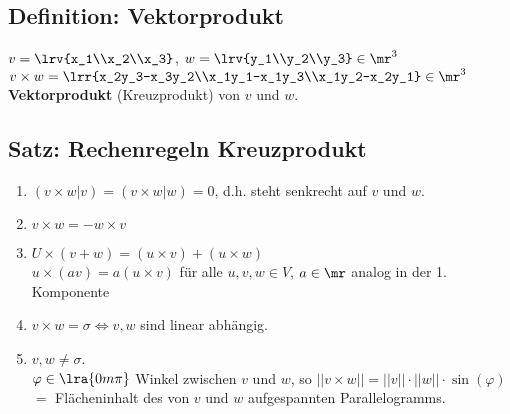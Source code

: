 \subsection{Definition: Vektorprodukt}
	$ v=\lrv{x_1\\x_2\\x_3} $, $ w=\lrv{y_1\\y_2\\y_3}\in\mr^3 $\\
	$ v\times w=\lrr{x_2y_3-x_3y_2\\x_1y_1-x_1y_3\\x_1y_2-x_2y_1}\in\mr^3 $
	\textbf{Vektorprodukt} (Kreuzprodukt) von $ v $ und $ w $.

\subsection{Satz: Rechenregeln Kreuzprodukt}
	\begin{enumerate}
		\item $ (v\times w|v)=(v\times w|w)=0 $, d.h. steht senkrecht auf $ v $ und $ w $.
		\item  $ v\times w =-w\times v$
		\item  $ U\times(v+w)=(u\times v)+(u\times w)$\\
		$ u\times(av)=a(u\times v) $ für alle $ u,v,w\in V $, $ a\in\mr $ analog in der 1. Komponente
		\item  $ v\times w=\sigma\Leftrightarrow v,w $ sind linear abhängig.
		\item  $ v,w\neq\sigma $.\\
		$ \varphi\in\lra{0m\pi} $ Winkel zwischen $ v $ und $ w $, so $ ||v\times w||=||v||\cdot ||w||\cdot\sin(\varphi) $\\
		$ = $ Flächeninhalt des von $ v $ und $ w $ aufgespannten Parallelogramms.

	\end{enumerate}
